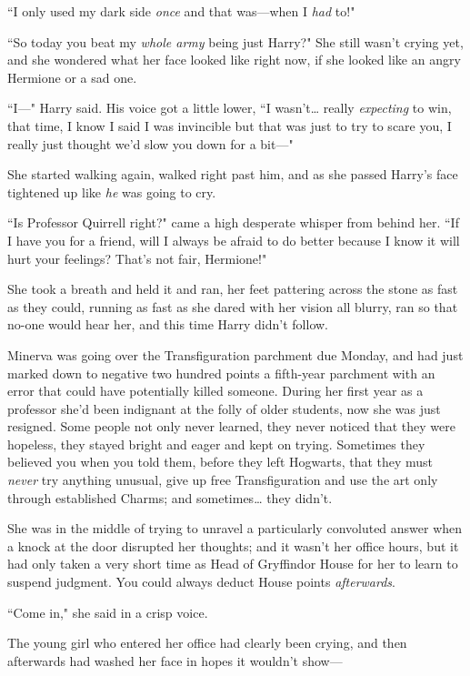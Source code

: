 ``I only used my dark side \emph{once} and that was—when I \emph{had} to!"

``So today you beat my \emph{whole army} being just Harry?" She still wasn't crying yet, and she wondered what her face looked like right now, if she looked like an angry Hermione or a sad one.

``I—" Harry said. His voice got a little lower, ``I wasn't{\ldots} really \emph{expecting} to win, that time, I know I said I was invincible but that was just to try to scare you, I really just thought we'd slow you down for a bit—"

She started walking again, walked right past him, and as she passed Harry's face tightened up like \emph{he} was going to cry.

``Is Professor Quirrell right?" came a high desperate whisper from behind her. ``If I have you for a friend, will I always be afraid to do better because I know it will hurt your feelings? That's not fair, Hermione!"

She took a breath and held it and ran, her feet pattering across the stone as fast as they could, running as fast as she dared with her vision all blurry, ran so that no-one would hear her, and this time Harry didn't follow.

\later

Minerva was going over the Transfiguration parchment due Monday, and had just marked down to negative two hundred points a fifth-year parchment with an error that could have potentially killed someone. During her first year as a professor she'd been indignant at the folly of older students, now she was just resigned. Some people not only never learned, they never noticed that they were hopeless, they stayed bright and eager and kept on trying. Sometimes they believed you when you told them, before they left Hogwarts, that they must \emph{never} try anything unusual, give up free Transfiguration and use the art only through established Charms; and sometimes{\ldots} they didn't.

She was in the middle of trying to unravel a particularly convoluted answer when a knock at the door disrupted her thoughts; and it wasn't her office hours, but it had only taken a very short time as Head of Gryffindor House for her to learn to suspend judgment. You could always deduct House points \emph{afterwards}.

``Come in," she said in a crisp voice.

The young girl who entered her office had clearly been crying, and then afterwards had washed her face in hopes it wouldn't show—

